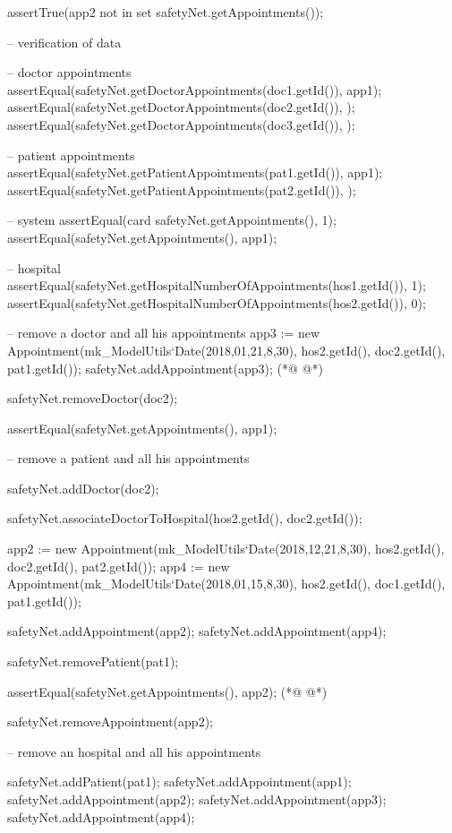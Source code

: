 \begin{vdmpp}[breaklines=true]
  assertTrue(app2 not in set safetyNet.getAppointments());
  
  -- verification of data
  
  -- doctor appointments
  assertEqual(safetyNet.getDoctorAppointments(doc1.getId()), {app1});
  assertEqual(safetyNet.getDoctorAppointments(doc2.getId()), {});
  assertEqual(safetyNet.getDoctorAppointments(doc3.getId()), {});
  
  -- patient appointments
  assertEqual(safetyNet.getPatientAppointments(pat1.getId()), {app1});
  assertEqual(safetyNet.getPatientAppointments(pat2.getId()), {});

  -- system
  assertEqual(card safetyNet.getAppointments(), 1);
  assertEqual(safetyNet.getAppointments(), {app1});
  
  -- hospital
  assertEqual(safetyNet.getHospitalNumberOfAppointments(hos1.getId()), 1);
  assertEqual(safetyNet.getHospitalNumberOfAppointments(hos2.getId()), 0);  


  -- remove a doctor and all his appointments
  app3 := new Appointment(mk_ModelUtils`Date(2018,01,21,8,30), hos2.getId(), doc2.getId(), pat1.getId());
  safetyNet.addAppointment(app3);
(*@
\label{testAddAgreement:740}
@*)
  
  safetyNet.removeDoctor(doc2);
  
  assertEqual(safetyNet.getAppointments(), {app1}); 
  
  
  -- remove a patient and all his appointments
  
  safetyNet.addDoctor(doc2);
  
  safetyNet.associateDoctorToHospital(hos2.getId(), doc2.getId());
    
  app2 := new Appointment(mk_ModelUtils`Date(2018,12,21,8,30), hos2.getId(), doc2.getId(), pat2.getId());
  app4 := new Appointment(mk_ModelUtils`Date(2018,01,15,8,30), hos2.getId(), doc1.getId(), pat1.getId());
  
  safetyNet.addAppointment(app2);
  safetyNet.addAppointment(app4);
  
  safetyNet.removePatient(pat1);
  
  assertEqual(safetyNet.getAppointments(), {app2}); 
(*@
\label{testRemoveAgreement:761}
@*)
  
  safetyNet.removeAppointment(app2);
  
  -- remove an hospital and all his appointments
  
  safetyNet.addPatient(pat1);
  safetyNet.addAppointment(app1);
  safetyNet.addAppointment(app2);
  safetyNet.addAppointment(app3);
  safetyNet.addAppointment(app4);
  

\end{vdmpp}
